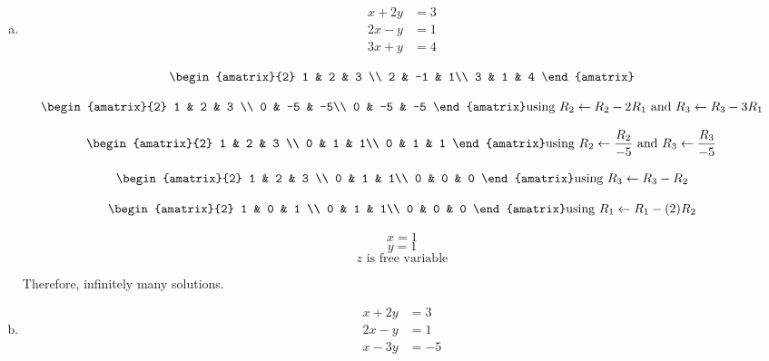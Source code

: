 \documentclass[11pt]{article}
\begin{document}
\begin{enumerate}[(a)]
    \item 
    \begin{align*}
        x + 2y &= 3 \\
        2x - y &= 1 \\
        3x + y &= 4
    \end{align*}
    
    \begin{Answer}
		$$\begin{amatrix}{2}
   		1 & 2 & 3 \\  
		2 & -1 & 1\\
		3 & 1 & 4
		\end{amatrix}$$
		
		$$\begin{amatrix}{2}
   		1 & 2 & 3 \\  
		0 & -5 & -5\\
		0 & -5 & -5
		\end{amatrix} \text{using } R_2 \leftarrow R_2 - 2R_1 \text{ and }  R_3 \leftarrow R_3 - 3R_1$$
		
		$$\begin{amatrix}{2}
   		1 & 2 & 3 \\  
		0 & 1 & 1\\
		0 & 1 & 1
		\end{amatrix} \text{using } R_2 \leftarrow \frac{R_2}{-5} \text{ and }  R_3 \leftarrow \frac{R_3}{-5}$$
		
		$$\begin{amatrix}{2}
   		1 & 2 & 3 \\  
		0 & 1 & 1\\
		0 & 0 & 0
		\end{amatrix}\text{using } R_3 \leftarrow R_3 - R_2$$
		
		$$\begin{amatrix}{2}
   		1 & 0 & 1 \\  
		0 & 1 & 1\\
		0 & 0 & 0
		\end{amatrix}\text{using } R_1 \leftarrow R_1 - (2)R_2$$
		
		$$x = 1$$
		$$y = 1$$
		$$z \text{ is free variable}$$
		
		Therefore, infinitely many solutions.
		
	\end{Answer}
    
    \item
    \begin{align*}
        x + 2y &= 3 \\
        2x - y &= 1 \\
        x - 3y &= -5
    \end{align*}
    

\end{enumerate}
\end{document}
